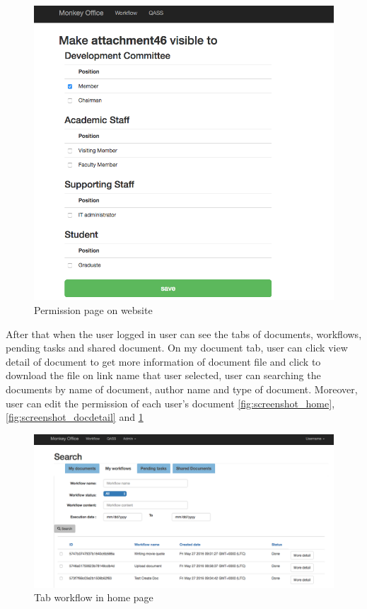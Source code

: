 \begin{figure}[h!]

	\centering
	\includegraphics[scale=0.3]{res/permission_page}
	\caption{Permission page on website}
	\label{fig:screenshot_permission}
\end{figure}


After that when the user logged in 	user can see the tabs of documents, workflows, pending tasks and shared document. On my document tab, user can click view detail of document to get more information of document file and click to download the file on link name that user selected, user can searching the documents by name of document, author name and type of document. Moreover, user can edit the permission of each user's document \ref{fig:screenshot_home}, \ref{fig:screenshot_docdetail} and \ref{fig:screenshot_permission}

\begin{figure}[h!]

	\centering
	\includegraphics[scale=0.3]{res/tab_wf_page}
	\caption{Tab workflow in home page}
	\label{fig:screenshot_tabwf}
\end{figure}

